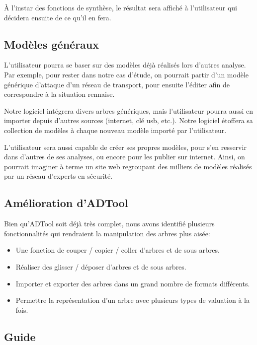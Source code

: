         \`A l'instar des fonctions de synthèse, le résultat sera affiché à l'utilisateur qui décidera ensuite de ce qu'il en fera.

    \subsection{Modèles généraux}
        \label{sec:modele}

        L'utilisateur pourra se baser sur des modèles déjà réalisés lors d'autres analyse. Par exemple, pour rester dans notre cas d'étude, on pourrait partir d'un modèle générique d'attaque d'un réseau de transport, pour ensuite l'éditer afin de correspondre à la situation rennaise.

        Notre logiciel intégrera divers arbres génériques, mais l'utilisateur pourra aussi en importer depuis d'autres sources (internet, clé usb, etc.). Notre logiciel étoffera sa collection de modèles à chaque nouveau modèle importé par l'utilisateur.

        L'utilisateur sera aussi capable de créer ses propres modèles, pour s'en resservir dans d'autres de ses analyses, ou encore pour les publier sur internet. Ainsi, on pourrait imaginer à terme un site web regroupant des milliers de modèles réalisés par un réseau d'experts en sécurité.

    \subsection{Amélioration d'ADTool}
        \label{sec:adtoolpp}

        Bien qu'ADTool soit déjà très complet, nous avons identifié plusieurs fonctionnalités qui rendraient la manipulation des arbres plus aisée:
        \begin{itemize}
            \item Une fonction de couper / copier / coller d'arbres et de sous arbres.
            \item Réaliser des glisser / déposer d'arbres et de sous arbres.
            \item Importer et exporter des arbres dans un grand nombre de formats différents.
            \item Permettre la représentation d'un arbre avec plusieurs types de valuation à la fois.
        \end{itemize}

    \subsection{Guide}
        \label{sec:guide}

